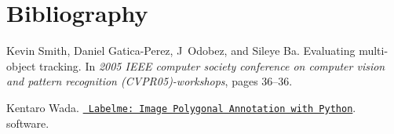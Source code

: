 \chapter{Bibliography}
\hypertarget{a00740}{}\label{a00740}

\begin{DoxyDescription}
\item[\label{a00740_CITEREF_evaluation}%
\Hypertarget{a00740_CITEREF_evaluation}%
\mbox{[}1\mbox{]}]Kevin Smith, Daniel Gatica-\/\+Perez, J~Odobez, and Sileye Ba. Evaluating multi-\/object tracking. In {\itshape 2005 IEEE computer society conference on computer vision and pattern recognition (CVPR\textquotesingle{}05)-\/workshops}, pages 36--36.


\item[\label{a00740_CITEREF_labelme}%
\Hypertarget{a00740_CITEREF_labelme}%
\mbox{[}2\mbox{]}]Kentaro Wada. \href{https://github.com/wkentaro/labelme}{\texttt{ Labelme\+: Image Polygonal Annotation with Python}}. software. 


\end{DoxyDescription}